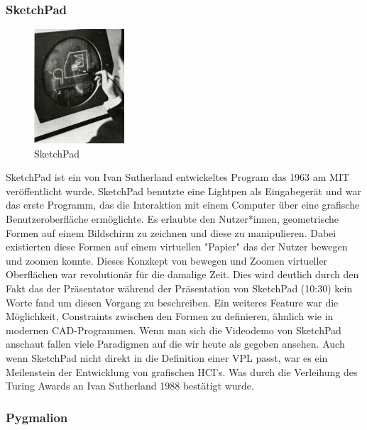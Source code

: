\documentclass[ngerman]{article}
\begin{document}
\subsubsection{SketchPad}
\label{sec:Sketchpad}
\begingroup
\setlength\intextsep{2pt}
\begin{minipage}{\linewidth}
\begin{figure}
  \centering
  \includegraphics[width=0.3\textwidth]{./graphics/sketchpad-sutherland.jpg} %
  \caption{SketchPad \cite{sutherlandSketchpad}}
  \label{fig:your_label}
\end{figure}
SketchPad ist ein von Ivan Sutherland entwickeltes Program das 1963 am MIT veröffentlicht wurde. 
SketchPad benutzte eine Lightpen als Eingabegerät und war das erste Programm, das die Interaktion mit einem Computer über eine grafische Benutzeroberfläche ermöglichte. 
Es erlaubte den Nutzer*innen, geometrische Formen auf einem Bildschirm zu zeichnen und diese zu manipulieren.
Dabei existierten diese Formen auf einem virtuellen "Papier" das der Nutzer bewegen und zoomen konnte. Dieses Konzkept von bewegen und Zoomen virtueller Oberflächen war revolutionär für die damalige Zeit.
  Dies wird deutlich durch den Fakt das der Präsentator während der Präsentation von SketchPad \cite{sketchpadDemo} (10:30) kein Worte fand um diesen Vorgang zu beschreiben.
Ein weiteres Feature war die Möglichkeit, Constraints zwischen den Formen zu definieren, ähnlich wie in modernen CAD-Programmen. 
Wenn man sich die Videodemo von SketchPad anschaut fallen viele Paradigmen auf die wir heute als gegeben ansehen.
\linebreak
\linebreak
Auch wenn SketchPad nicht direkt in die Definition einer VPL passt, war es ein Meilenstein der Entwicklung von grafischen HCI's. Was durch die Verleihung des Turing Awards an Ivan Sutherland 1988 bestätigt wurde.
\end{minipage}
\endgroup
\subsubsection{Pygmalion}
\end{document}
